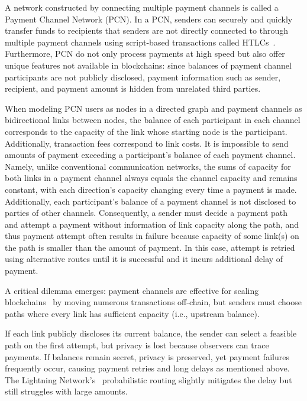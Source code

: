 \documentclass[conference]{IEEEtran}
\begin{document}
A network constructed by connecting multiple payment channels is called a Payment Channel Network (PCN).
In a PCN, senders can securely and quickly transfer funds to recipients that senders are not directly connected to through multiple payment channels using script-based transactions called HTLCs~\cite{poon_dryja_2016}.
Furthermore, PCN do not only process payments at high speed but also offer unique features not available in blockchains: since balances of payment channel participants are not publicly disclosed, payment information such as sender, recipient, and payment amount is hidden from unrelated third parties.

When modeling PCN users as nodes in a directed graph and payment channels as bidirectional links between nodes, the balance of each participant in each channel corresponds to the capacity of the link whose starting node is the participant.
Additionally, transaction fees correspond to link costs.
It is impossible to send amounts of payment exceeding a participant's balance of each payment channel.
Namely, unlike conventional communication networks, the sums of capacity for both links in a payment channel always equals the channel capacity and remains constant, with each direction's capacity changing every time a payment is made.
Additionally, each participant's balance of a payment channel is not disclosed to parties of other channels.
Consequently, a sender must decide a payment path and attempt a payment without information of link capacity along the path, and thus payment attempt often results in failure because capacity of some link(s) on the path is smaller than the amount of payment. In this case, attempt is retried using alternative routes until it is successful and it incurs additional delay of payment.

A critical dilemma emerges: payment channels are effective for scaling blockchains~\cite{poon_dryja_2016} by moving numerous transactions off-chain, but senders must choose paths where every link has sufficient capacity (i.e., upstream balance).

If each link publicly discloses its current balance, the sender can select a feasible path on the first attempt, but privacy is lost because observers can trace payments.
If balances remain secret, privacy is preserved, yet payment failures frequently occur, causing payment retries and long delays as mentioned above.
The Lightning Network's~\cite{lnbolt} probabilistic routing slightly mitigates the delay but still struggles with large amounts.
\end{document}
